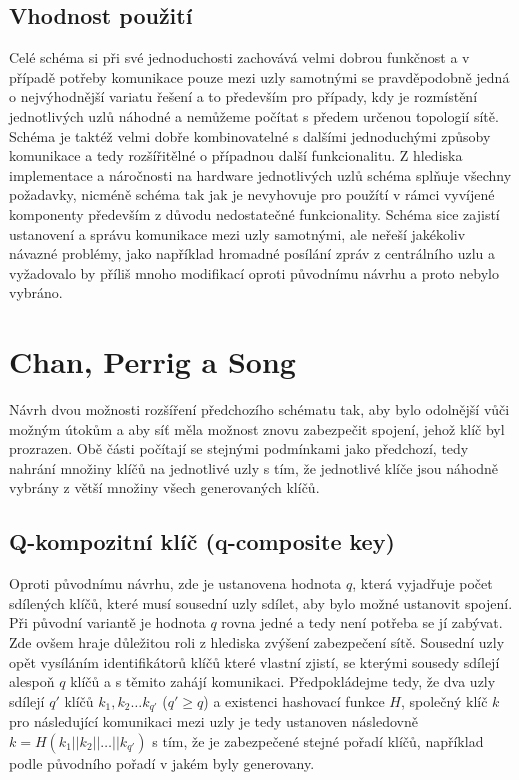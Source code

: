 \documentclass[11pt,final,twoside]{fithesis2}
\begin{document}
\subsection{Vhodnost použití}
Celé schéma si při své jednoduchosti zachovává velmi dobrou funkčnost a v případě potřeby komunikace pouze mezi uzly samotnými se pravděpodobně jedná o nejvýhodnější
variatu řešení a to především pro případy, kdy je rozmístění jednotlivých uzlů náhodné a nemůžeme počítat s předem určenou topologií sítě. Schéma je taktéž velmi dobře kombinovatelné
s dalšími jednoduchými způsoby komunikace a tedy rozšířitělné o případnou další funkcionalitu. Z hlediska implementace a náročnosti na hardware jednotlivých uzlů schéma
splňuje všechny požadavky, nicméně schéma tak jak je nevyhovuje pro použítí v rámci vyvíjené komponenty především z důvodu nedostatečné funkcionality. Schéma sice zajistí ustanovení
a správu komunikace mezi uzly samotnými, ale neřeší jakékoliv návazné problémy, jako například hromadné posílání zpráv z centrálního uzlu a vyžadovalo by příliš mnoho modifikací oproti 
původnímu návrhu a proto nebylo vybráno.

\section{Chan, Perrig a Song} \label{sec:Chan}
Návrh dvou možnosti rozšíření \cite{Perrig2003} předchozího schématu \cite{Eschenauer2002} tak, aby bylo odolnější vůči možným útokům a aby síť měla možnost znovu zabezpečit spojení, jehož
klíč byl prozrazen. Obě části počítají se stejnými podmínkami jako předchozí, tedy nahrání množiny klíčů na jednotlivé uzly s tím, že jednotlivé klíče jsou náhodně vybrány 
z větší množiny všech generovaných klíčů.

\subsection{Q-kompozitní klíč (q-composite key)}
Oproti původnímu návrhu, zde je ustanovena hodnota $q$, která vyjadřuje počet sdílených klíčů, které musí sousední uzly sdílet, aby bylo možné ustanovit spojení. Při původní variantě 
je hodnota $q$ rovna jedné a tedy není potřeba se jí zabývat. Zde ovšem hraje důležitou roli z hlediska zvýšení zabezpečení sítě. Sousední uzly opět vysíláním identifikátorů klíčů které vlastní
zjistí, se kterými sousedy sdílejí alespoň $q$ klíčů a s těmito zahájí komunikaci. Předpokládejme tedy, že dva uzly sdílejí $q'$ klíčů $k_1, k_2 \dots k_{q'}$ ($q' \ge q$) a existenci hashovací funkce $H$, 
společný klíč $k$ pro následující komunikaci mezi uzly je tedy ustanoven následovně $k=H(k_1 || k_2 || \dots || k_{q'})$ s tím, že je zabezpečené stejné pořadí klíčů, například podle původního
pořadí v jakém byly generovany. 
\end{document}
